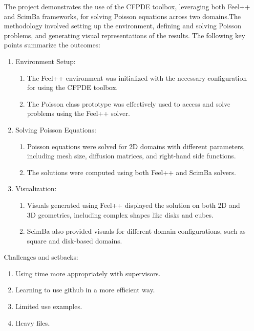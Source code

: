 \documentclass[12pt]{article}
\begin{document}
\begin{frame}
The project demonstrates the use of the CFPDE toolbox, leveraging both Feel++ and ScimBa frameworks, for solving Poisson equations across two domains.The methodology involved setting up the environment, defining and solving Poisson problems, and generating visual representations of the results. The following key points summarize the outcomes:
\begin{enumerate}
    \item Environment Setup:
        \begin{enumerate}
            \item The Feel++ environment was initialized with the necessary configuration for using the CFPDE toolbox.
            \item The Poisson class prototype was effectively used to access and solve problems using the Feel++ solver.
        \end{enumerate}
        
    \item Solving Poisson Equations:
        \begin{enumerate}
            \item Poisson equations were solved for 2D domains with different parameters, including mesh size, diffusion matrices, and right-hand side functions.
            \item The solutions were computed using both Feel++ and ScimBa solvers.
        \end{enumerate}  

    \item Visualization:
        \begin{enumerate}
            \item Visuals generated using Feel++ displayed the solution on both 2D and 3D geometries, including complex shapes like disks and cubes.
            \item ScimBa also provided visuals for different domain configurations, such as square and disk-based domains.            
        \end{enumerate}  
  
\end{enumerate}
\item Challenges and setbacks:
    \begin{enumerate}
        \item Using time more appropriately with supervisors.
        \item Learning to use github in a more efficient way.
        \item Limited use examples. 
        \item Heavy files.          


\end{enumerate}
\end{frame}
\end{document}

